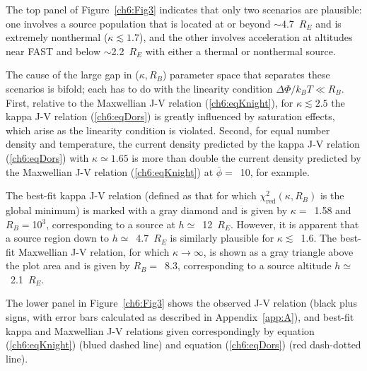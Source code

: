   The top panel of Figure~\ref{ch6:Fig3} indicates that only two scenarios are
  plausible: one involves a source population that is located at or beyond
  $\sim$4.7~$R_E$ and is extremely nonthermal ($\kappa \lesssim 1.7$), and the
  other involves acceleration at altitudes near FAST and below $\sim$2.2~$R_E$
  with either a thermal or nonthermal source.

  The cause of the large gap in ($\kappa, R_B$) parameter space that separates
  these scenarios is bifold; each has to do with the linearity condition
  $\Delta \Phi / k_B T \ll R_B $. First, relative to the Maxwellian J-V relation
  (\ref{ch6:eqKnight}), for $\kappa \lesssim 2.5$ the kappa J-V relation
  (\ref{ch6:eqDors}) is greatly influenced by saturation effects, which arise as
  the linearity condition is violated. Second, for equal number density and
  temperature, the current density predicted by the kappa J-V relation
  (\ref{ch6:eqDors}) with $\kappa \simeq 1.65$ is more than double the current
  density predicted by the Maxwellian J-V relation (\ref{ch6:eqKnight}) at
  $\bar{\phi} =$~10, for example.

  The best-fit kappa J-V relation (defined as that for which
  $\chi^2_{\textrm{red}} ( \kappa, R_B )$ is the global minimum) is marked with
  a gray diamond and is given by $\kappa =$~1.58 and $R_B =$10$^3$,
  corresponding to a source at $h \simeq$~12~$R_E$. However, it is apparent that
  a source region down to $h \simeq$~4.7~$R_E$ is similarly plausible for
  $\kappa \lesssim$~1.6. The best-fit Maxwellian J-V relation, for which
  $\kappa \rightarrow \infty$, is shown as a gray triangle above the plot area
  and is given by $R_B =$~8.3, corresponding to a source altitude
  $h \simeq$~2.1~$R_E$.

  The lower panel in Figure~\ref{ch6:Fig3} shows the observed J-V relation
  (black plus signs, with error bars calculated as described in
  Appendix~\ref{app:A}), and best-fit kappa and Maxwellian J-V relations given
  correspondingly by equation (\ref{ch6:eqKnight}) (blued dashed line) and
  equation (\ref{ch6:eqDors}) (red dash-dotted line).

